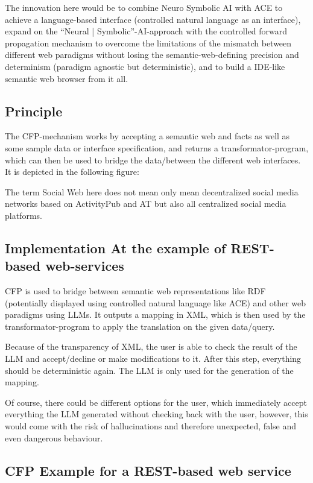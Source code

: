 \documentclass[12pt,a4paper]{article}
\begin{document}
The innovation here would be to combine Neuro Symbolic AI with ACE to achieve a language-based interface (controlled natural language as an interface), expand on the ``Neural | Symbolic''-AI-approach with the controlled forward propagation mechanism to overcome the limitations of the mismatch between different web paradigms without losing the semantic-web-defining precision and determinism (paradigm agnostic but deterministic), and to build a IDE-like semantic web browser from it all.

\subsection{Principle}

The CFP-mechanism works by accepting a semantic web and facts as well as some sample data or interface specification, and returns a transformator-program, which can then be used to bridge the data/between the different web interfaces. It is depicted in the following figure:

The term Social Web here does not mean only mean decentralized social media networks based on ActivityPub and AT but also all centralized social media platforms.

\subsection{Implementation At the example of REST-based web-services}

CFP is used to bridge between semantic web representations like RDF (potentially displayed using controlled natural language like ACE) and other web paradigms using LLMs. It outputs a mapping in XML, which is then used by the transformator-program to apply the translation on the given data/query.

Because of the transparency of XML, the user is able to check the result of the LLM and accept/decline or make modifications to it. After this step, everything should be deterministic again. The LLM is only used for the generation of the mapping.

Of course, there could be different options for the user, which immediately accept everything the LLM generated without checking back with the user, however, this would come with the risk of hallucinations and therefore unexpected, false and even dangerous behaviour.

\subsection{CFP Example for a REST-based web service}
\end{document}
